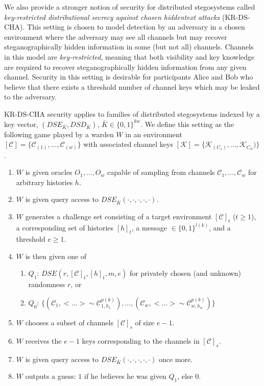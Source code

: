 \documentclass{article}
\begin{document}
We also provide a stronger notion of security for distributed stegosystems called \textit{key-restricted distributional secrecy against chosen hiddentext
attacks} (KR-DS-CHA).  This setting is chosen to model detection by an adversary in a chosen environment where the adversary may see all channels 
but may recover steganographically hidden information in some (but not all) channels.  Channels in this model are \textit{key-restricted}, meaning that both visibility and key knowledge are required to recover steganographically hidden information from any given channel.  Security in this setting is desirable for participants 
Alice and Bob who believe that there exists a threshold number of channel keys which may be leaked to the adversary.

KR-DS-CHA security applies to families of distributed stegosystems indexed by a key vector, $(DSE_{\bar{K}}, DSD_{\bar{K}})$, $\bar{K} \in \{0,1\}^{kw}$.
We define this setting as the following game played by a warden $W$ in an environment 
$[\mathcal{C}] = \{ \mathcal{C}_{(1)}, ..., \mathcal{C}_{(w)} \}$ with associated channel keys 
$[\mathcal{K}] = \{ \mathcal{K}_{(C_1)}, ..., \mathcal{K}_{C_w}) \}$.

\begin{enumerate}
\item{$W$ is given oracles $O_1,...,O_w$ capable of sampling from channels $\mathcal{C}_{1},...,\mathcal{C}_{w}$ for arbitrary histories 
$h$.}
\item{$W$ is given query access to $DSE_{\bar{K}}(\cdot,\cdot,\cdot,\cdot,\cdot)$.}
\item{$W$ generates a challenge set consisting of a target environment $[\mathcal{C}]_t$ ($t \geq 1$), a corresponding set of histories 
$[h]_t$, a message $\in \{0,1\}^{l(k)}$, and a threshold $e \geq 1$.}
\item{$W$ is then given one of }
\begin{enumerate}
\item{$Q_1$: $DSE(r,[\mathcal{C}]_t, [h]_t, m, e)$ for privately chosen (and unknown) randomness $r$, or}
\item{$Q_0$: $\{ (\mathcal{C}_1, <...> \sim \mathcal{C}_{1,h_{1}}^{p(k)}), ..., (\mathcal{C}_w, <...> \sim \mathcal{C}_{w,h_{w}}^{p(k)})\}$}
\end{enumerate}
\item{$W$ chooses a subset of channels $[\mathcal{C}]_s$ of size $e-1$.}
\item{$W$ receives the $e-1$ keys corresponding to the channels in $[\mathcal{C}]_s$.}
\item{$W$ is given query access to $DSE_{\bar{K}}(\cdot,\cdot,\cdot,\cdot,\cdot)$ once more.}
\item{$W$ outputs a guess: $1$ if he believes he was given $Q_1$, else $0$.}
\end{enumerate}
\end{document}
